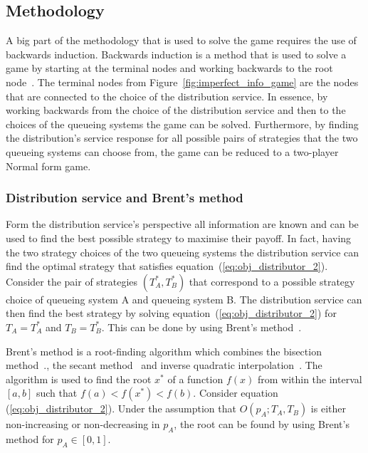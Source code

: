 \subsection{Methodology}

A big part of the methodology that is used to solve the game requires the use of
backwards induction.
Backwards induction is a method that is used to solve a game by starting at the
terminal nodes and working backwards to the root node~\cite{watson2002strategy}.
The terminal nodes from Figure~\ref{fig:imperfect_info_game} are the nodes that
are connected to the choice of the distribution service.
In essence, by working backwards from the choice of the distribution service
and then to the choices of the queueing systems the game can be solved.
Furthermore, by finding the distribution's service response for all possible
pairs of strategies that the two queueing systems can choose from, the game can
be reduced to a two-player Normal form game.


\subsubsection{Distribution service and Brent's method}
\label{sec:best_response_distribution_service}

Form the distribution service's perspective all information are known and can be
used to find the best possible strategy to maximise their payoff.
In fact, having the two strategy choices of the two queueing systems the
distribution service can find the optimal strategy that satisfies
equation~(\ref{eq:obj_distributor_2}).
Consider the pair of strategies \((T_A^*, T_B^*)\) that correspond to a possible
strategy choice of queueing system A and queueing system B.
The distribution service can then find the best strategy by solving
equation~(\ref{eq:obj_distributor_2}) for \(T_A = T_A^*\) and \(T_B = T_B^*\).
This can be done by using Brent's method~\cite{brent_method}.

Brent's method is a root-finding algorithm which combines the bisection
method~\cite{corliss1977root}., the secant method~\cite{secantmethod} and
inverse quadratic interpolation~\cite{epperson2021introduction}.
The algorithm is used to find the root \(x^*\) of a function \(f(x)\) from
within the interval \([a, b]\) such that \(f(a) < f(x^*) < f(b)\).
Consider equation (\ref{eq:obj_distributor_2}).
Under the assumption that \(O(p_A; T_A, T_B)\) is either non-increasing or
non-decreasing in \(p_A\), the root can be found by using Brent's method
for \(p_A \in [0, 1]\).

